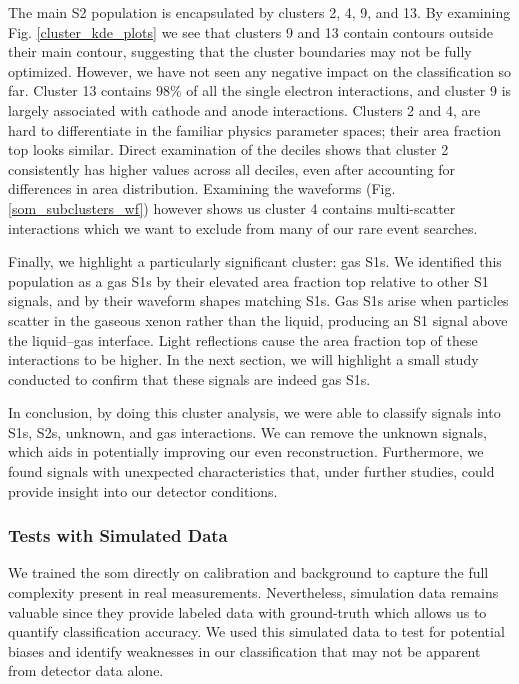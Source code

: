 The main S2 population is encapsulated by clusters 2, 4, 9, and 13. By examining Fig. \ref{cluster_kde_plots} we see that clusters 9 and 13 contain contours outside their main contour, suggesting that the cluster boundaries may not be fully optimized. However, we have not seen any negative impact on the classification so far. Cluster 13 contains 98\% of all the single electron interactions, and cluster 9 is largely associated with cathode and anode interactions. Clusters 2 and 4, are hard to differentiate in the familiar physics parameter spaces; their area fraction top looks similar. Direct examination of the deciles shows that cluster 2 consistently has higher values across all deciles, even after accounting for differences in area distribution. Examining the waveforms (Fig.\,\ref{som_subclusters_wf}) however shows us cluster 4 contains multi-scatter interactions which we want to exclude from many of our rare event searches.

Finally, we highlight a particularly significant cluster: gas S1s. We identified this population as a gas S1s by their elevated area fraction top relative to other S1 signals, and by their waveform shapes matching S1s. Gas S1s arise when particles scatter in the gaseous xenon rather than the liquid, producing an S1 signal above the liquid–gas interface. Light reflections cause the area fraction top of these interactions to be higher. In the next section, we will highlight a small study conducted to confirm that these signals are indeed gas S1s.

In conclusion, by doing this cluster analysis, we were able to classify signals into S1s, S2s, unknown, and gas interactions. We can remove the unknown signals, which aids in potentially improving our even reconstruction. Furthermore, we found signals with unexpected characteristics that, under further studies, could provide insight into our detector conditions.

\subsubsection{Tests with Simulated Data}

We trained the \acrshort{som} directly on calibration and background to capture the full complexity present in real measurements. Nevertheless, simulation data remains valuable since they provide labeled data with ground-truth which allows us to quantify classification accuracy. We used this simulated data to test for potential biases and identify weaknesses in our classification that may not be apparent from detector data alone.

